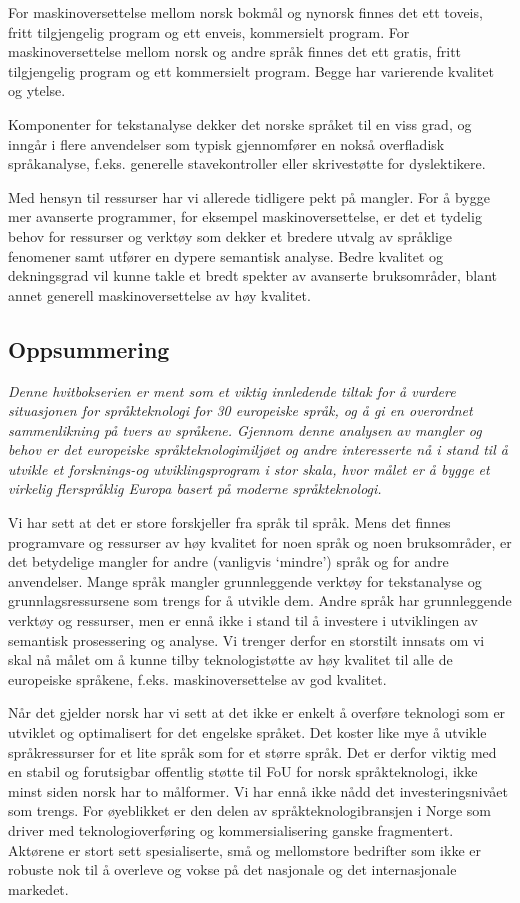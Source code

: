 \begin{multicols}{2}
For maskinoversettelse mellom norsk bokmål og nynorsk finnes det ett toveis, fritt tilgjengelig program og ett enveis, kommersielt program. 
For maskinoversettelse mellom norsk og andre språk finnes det ett gratis, fritt tilgjengelig program og ett kommersielt program. Begge har varierende kvalitet og ytelse.

Komponenter for tekstanalyse dekker det norske språket til en viss grad, og inngår i flere anvendelser som typisk gjennomfører en nokså overfladisk språkanalyse, f.eks. generelle stavekontroller eller skrivestøtte for dyslektikere.

Med hensyn til ressurser har vi allerede tidligere pekt på mangler.
For å bygge mer avanserte programmer, for eksempel maskinoversettelse, er det et tydelig behov for ressurser og verktøy som dekker et bredere utvalg av språklige fenomener samt utfører en dypere semantisk analyse. Bedre kvalitet og dekningsgrad vil kunne takle et bredt spekter av avanserte bruksområder, blant annet generell maskinoversettelse av høy kvalitet.

\subsection{Oppsummering}

\emph{Denne hvitbokserien er ment som et viktig innledende tiltak for å vurdere situasjonen for språkteknologi for 30 europeiske språk, og å gi en overordnet sammenlikning på tvers av språkene. Gjennom denne analysen av mangler og behov er det europeiske språkteknologimiljøet og andre interesserte nå i stand til å utvikle et forsknings-og utviklingsprogram i stor skala, hvor målet er å bygge et virkelig flerspråklig Europa basert på moderne språkteknologi.}

Vi har sett at det er store forskjeller fra språk til språk. Mens det finnes programvare og ressurser av høy kvalitet for noen språk og noen bruksområder, er det betydelige mangler for andre (vanligvis `mindre') språk og for andre anvendelser. Mange språk mangler grunnleggende verktøy for tekstanalyse og grunnlagsressursene som trengs for å utvikle dem. Andre språk har grunnleggende verktøy og ressurser, men er ennå ikke i stand til å investere i utviklingen av semantisk prosessering og analyse. Vi trenger derfor en storstilt innsats om vi skal nå målet om å kunne tilby teknologistøtte av høy kvalitet til alle de europeiske språkene, f.eks. maskinoversettelse av god kvalitet.

Når det gjelder norsk har vi sett at det ikke er enkelt å overføre teknologi som er utviklet og optimalisert for det engelske språket. 
Det koster like mye å utvikle språkressurser for et lite språk som for et større språk. Det er derfor viktig med en stabil og forutsigbar offentlig støtte til FoU for norsk språkteknologi, ikke minst siden norsk har to målformer. 
Vi har ennå ikke nådd det investeringsnivået som trengs. For øyeblikket er den delen av språkteknologibransjen i Norge som driver med teknologioverføring og kommersialisering ganske fragmentert. Aktørene er stort sett spesialiserte, små og mellomstore bedrifter som ikke er robuste nok til å overleve og vokse på det nasjonale og det internasjonale markedet.


\end{multicols}
